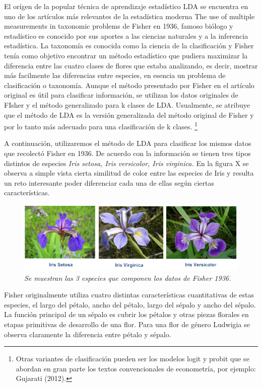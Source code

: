 \documentclass[letterpaper,12pt, spanish, oneside]{book} %
\let\oldfootnote\footnote
\renewcommand{\footnote}[1]{%
  \begingroup%
  \linespread{1.2}%
  \oldfootnote{#1}%
  \endgroup%
}
\begin{document}
El orígen de la popular técnica de aprendizaje estadístico LDA se encuentra en uno de los artículos más relevantes de la estadística moderna The use of multiple measurements in taxonomic problems de Fisher en 1936, famoso biólogo y estadístico es conocido por sus aportes a las ciencias naturales y a la inferencia estadística. La taxonomía es conocida como la ciencia de la clasificación y Fisher tenía como objetivo encontrar un método estadístico que pudiera maximizar la diferencia entre las cuatro clases de flores que estaba analizando, es decir, mostrar más facilmente las diferencias entre especies, en esencia un problema de clasificación o taxonomía. Aunque el método presentado por Fisher en el artículo original es útil para clasificar información, se utilizan los datos originales de FIsher y el método generalizado para k clases de LDA. Usualmente, se atribuye que el método de LDA es la versión generalizada del método original de Fisher y por lo tanto más adecuado para una clasificación de k clases.\footnote{Otras variantes de clasificación pueden ser los modelos logit y probit que se abordan en gran parte los textos convencionales de econometría, por ejemplo:  Gujarati (2012).}

A continuación, utilizaremos el método de LDA para clasificar los mismos datos que recolectó Fisher en 1936. De acuerdo con la información se tienen tres tipos distintos de especies\textit{ Iris setosa, Iris versicolor, Iris virginica.} En la figura X se observa a simple vista cierta similitud de color entre las especies de Iris y resulta un reto interesante poder diferenciar cada una de ellas según ciertas características.

\begin{figure}[H]
\centering
\includegraphics[width=1\textwidth]{iris1.png}
\caption{\label{fig:frog2}\textit{Se muestran las 3 especies que componen los datos de Fisher 1936.}}
\end{figure}

Fisher originalmente utiliza cuatro distintas características cuantitativas de estas especies, el largo del pétalo, ancho del pétalo, largo del sépalo y ancho del sépalo. La función principal de un sépalo es cubrir los pétalos y otras piezas florales en etapas primitivas de desarrollo de una flor. Para una flor de género Ludwigia se observa claramente la diferencia entre pétalo y sépalo.
\end{document}
